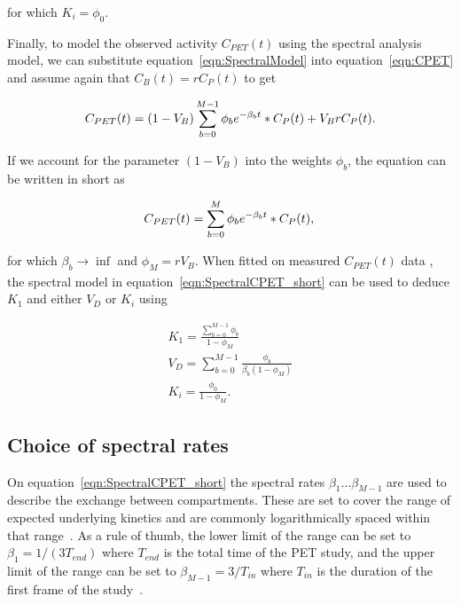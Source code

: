 for which $K_i = {\phi_0}$. 

Finally, to model the observed activity $C_{PET}(t)$ using the spectral analysis model, we can substitute equation~\ref{eqn:SpectralModel} into equation~\ref{eqn:CPET} and assume again that $C_{B}(t) = r C_{P}(t)$ to get

\begin{equation} 
{C_{PET}}(t)  = (1-V_{B}) \sum_{b=0}^{M-1} {\phi_b}  e^{-\beta_b t} \ast C_P(t) + V_{B} r C_P(t)   \\ . \\
\label{eqn:SpectralCPET}
\end{equation}

If we account for the parameter $(1-V_{B})$ into the weights $\phi_b$, the equation can be written in short as 

\begin{equation} 
{C_{PET}}(t)  = \sum_{b=0}^{M} {\phi_b} e^{-\beta_b t} \ast C_P(t)   \\ , \\
\label{eqn:SpectralCPET_short}
\end{equation}

for which $\beta_b \xrightarrow[]{}\inf$ and $\phi_M = r V_{B}$. 
When fitted on measured ${C_{PET}}(t)$ data , the spectral model in equation~\ref{eqn:SpectralCPET_short} can be used to deduce $K_1$ and either $V_D$ or $K_i$ using

\begin{subequations}
\begin{align}
K_1 = \frac{\sum_{b=0}^{M-1} {\phi_b}}{1-{\phi_M}}   \\  
V_D = \sum_{b=0}^{M-1} \frac {\phi_b}{\beta_b (1-\phi_M)} \\
K_i = \frac{\phi_0}{1-\phi_M} . 
\end{align}
\label{eqn:SpectralCPET_AllEquations}
\end{subequations}

\subsection{Choice of spectral rates}

On equation~\ref{eqn:SpectralCPET_short} the spectral rates $\beta_1 ... \beta_{M-1}$ are used to describe the exchange between compartments. These are set to cover the range of expected underlying kinetics and are commonly logarithmically spaced within that range~\cite{Gunn2002}.
As a rule of thumb, the lower limit of the range can be set to $\beta_1 = 1/(3 T_{end})$ where $T_{end}$ is the total time of the PET study, and the upper limit of the range can be set to $\beta_{M-1} = 3/T_{in}$ where $T_{in}$ is the duration of the first frame of the study~\cite{Veronese2016}.

